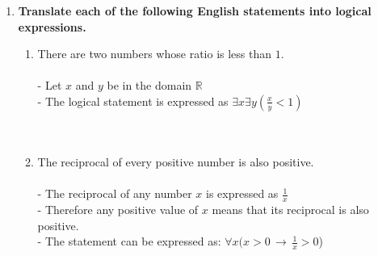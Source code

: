 \documentclass{amsart}
\theoremstyle{definition}
\theoremstyle{Exercise}
\theoremstyle{remark}
\theoremstyle{rule}
\numberwithin{equation}{section}
\begin{document}
\begin{enumerate}[label=(\alph*)]
\item {\bf Translate each of the following English statements into logical expressions.}
\begin{enumerate}[label=(\roman*)]
  \item There are two numbers whose ratio is less than $1$.
   \\\\
  - Let $x$ and $y$ be in the domain $\mathbb{R}$\\
  - The logical statement is expressed as $\exists x \exists y(\frac{x}{y} < 1)$\\
\\\\
  \item The reciprocal of every positive number is also positive.
   \\\\
  - The reciprocal of any number $x$ is expressed as $\frac{1}{x}$\\
  - Therefore any positive value of $x$ means that its reciprocal is also positive.\\
  - The statement can be expressed as: $\forall x(x > 0\, \rightarrow\, \frac{1}{x} > 0$)\\
\\\\
  \end{enumerate}
  \end{enumerate}
  \newpage
  \section*{}
  \section*{}
\end{document}
